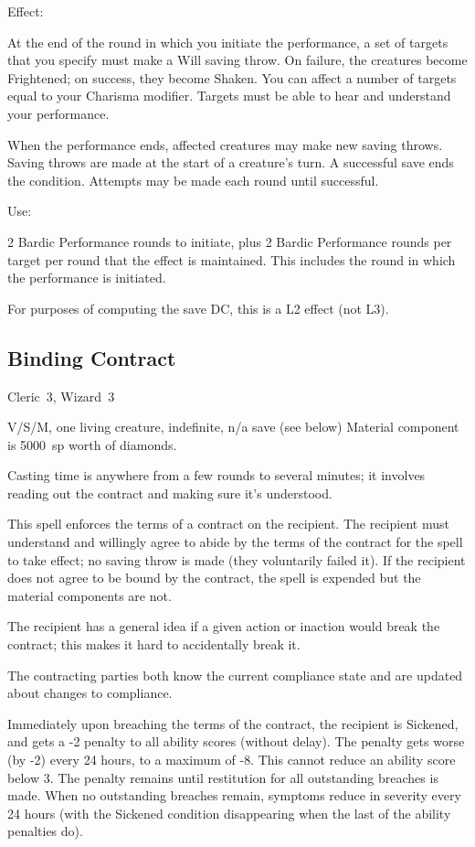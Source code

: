 Effect:

At the end of the round in which you initiate the performance, a set of
targets that you specify must make a Will saving throw. On failure, the
creatures become Frightened; on success, they become Shaken. You can affect
a number of targets equal to your Charisma modifier. Targets must be able
to hear and understand your performance.

When the performance ends, affected creatures may make new saving throws.
Saving throws are made at the start of a creature's turn. A successful
save ends the condition. Attempts may be made each round until successful.

Use:

2 Bardic Performance rounds to initiate, plus 2 Bardic Performance rounds
per target per round that the effect is maintained. This includes the
round in which the performance is initiated.

For purposes of computing the save DC, this is a L2 effect (not L3).
%

%
\subsection{Binding Contract}

Cleric~3, Wizard~3

V/S/M, one living creature, indefinite, n/a save (see below)
Material component is 5000~sp worth of diamonds.

Casting time is anywhere from a few rounds to several minutes; it involves
reading out the contract and making sure it's understood.

This spell enforces the terms of a contract on the recipient. The recipient
must understand and willingly agree to abide by the terms of the contract
for the spell to take effect; no saving throw is made (they voluntarily
failed it). If the recipient does not agree to be bound by the contract,
the spell is expended but the material components are not.

The recipient has a general idea if a given action or inaction would break
the contract; this makes it hard to accidentally break it.

The contracting parties both know the current compliance state and are
updated about changes to compliance.

Immediately upon breaching the terms of the contract, the recipient is
Sickened, and gets a -2 penalty to all ability scores (without delay).
The penalty gets worse (by -2) every 24 hours, to a maximum of -8. This
cannot reduce an ability score below 3. The penalty remains until
restitution for all outstanding breaches is made. When no outstanding
breaches remain, symptoms reduce in severity every 24 hours (with the
Sickened condition disappearing when the last of the ability penalties do).

